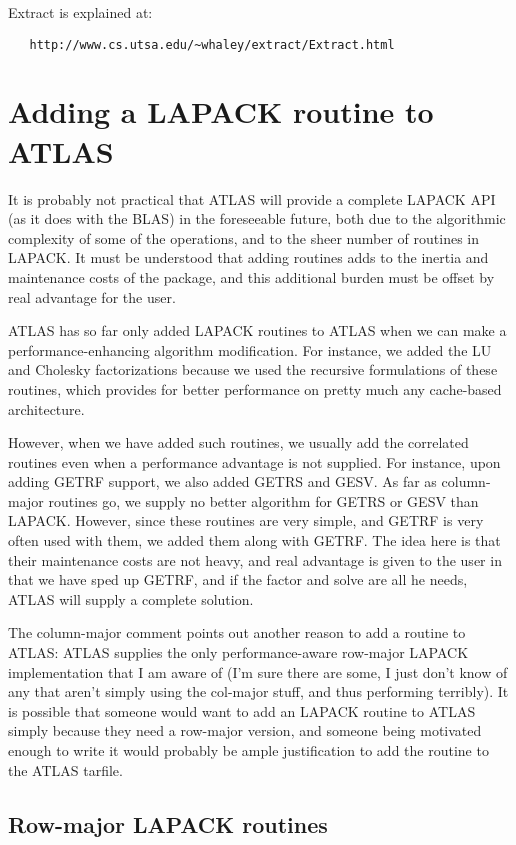\documentclass[11pt]{article}
\begin{document}
Extract is explained at:
\begin{verbatim}
   http://www.cs.utsa.edu/~whaley/extract/Extract.html
\end{verbatim}

\section{Adding a LAPACK routine to ATLAS}

It is probably not practical that ATLAS will provide a complete LAPACK
API (as it does with the BLAS) in the foreseeable future, both due to the
algorithmic complexity of some of the operations, and to the sheer number
of routines in LAPACK.  It must be understood that adding routines adds
to the inertia and maintenance costs of the package, and this additional
burden must be offset by real advantage for the user.

ATLAS has so far only added LAPACK routines to ATLAS when we can make a
performance-enhancing algorithm modification.  For instance, we added the
LU and Cholesky factorizations because we used the recursive formulations
of these routines, which provides for better performance on pretty much
any cache-based architecture.

However, when we have added such routines, we usually add the correlated
routines even when a performance advantage is not supplied.  For instance,
upon adding GETRF support, we also added GETRS and GESV.  As far as column-
major routines go, we supply no better algorithm for GETRS or GESV than
LAPACK.  However, since these routines are very simple, and GETRF is very
often used with them, we added them along with GETRF.  The idea here is that
their maintenance costs are not heavy, and real advantage is given to the
user in that we have sped up GETRF, and if the factor and solve are all
he needs, ATLAS will supply a complete solution.

The column-major comment points out another reason to add a routine to
ATLAS: ATLAS supplies the only performance-aware row-major LAPACK
implementation that I am aware of (I'm sure there are some, I just don't
know of any that aren't simply using the col-major stuff, and thus
performing terribly).  It is possible that someone would want to add an
LAPACK routine to ATLAS simply because they need a row-major version, and
someone being motivated enough to write it would probably be ample
justification to add the routine to the ATLAS tarfile.

\subsection{Row-major LAPACK routines}
\end{document}

